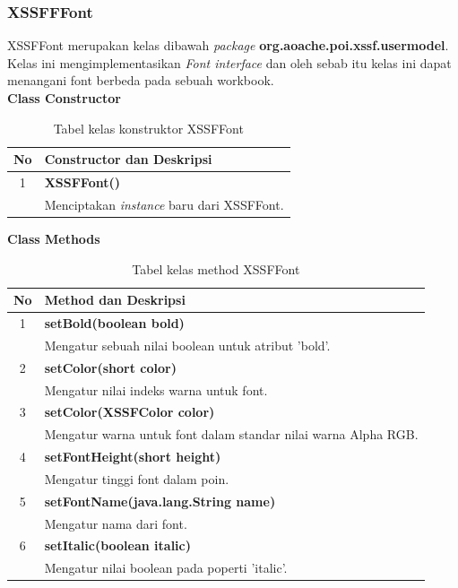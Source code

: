\subsubsection{XSSFFFont}
\label{subs:XSSFFFont}
XSSFFont merupakan kelas dibawah \textit{package} \textbf{org.aoache.poi.xssf.usermodel}. Kelas ini mengimplementasikan \textit{Font interface} dan oleh sebab itu kelas ini dapat menangani font berbeda pada sebuah workbook.\cite{apachepoi2}
\\
\noindent \textbf{Class Constructor}
\begin{table}[H]
		\centering
		\caption{Tabel kelas konstruktor XSSFFont}
		\label{tab:KonstrukXSSFFont}
	\begin{tabular}{|c|p{12cm}|}
		\hline
		\textbf{No} & \textbf{Constructor dan Deskripsi} \\ \hline \hline
		1 & \textbf{XSSFFont()}\\
			&	Menciptakan \textit{instance} baru dari XSSFFont.\\ \hline
	\end{tabular}
\end{table}

\noindent \textbf{Class Methods}
\begin{table}[H]
		\centering
		\caption{Tabel kelas method XSSFFont}
		\label{tab:methodXSSFFont}
	\begin{tabular}{|c|p{12cm}|}
		\hline
		\textbf{No} & \textbf{Method dan Deskripsi} \\ \hline \hline
		1 & \textbf{setBold(boolean bold)}\\
			&	Mengatur sebuah nilai boolean untuk atribut 'bold'.\\ \hline
		2 & \textbf{setColor(short color)}\\
			&	Mengatur nilai indeks warna untuk font.\\ \hline
		3 & \textbf{setColor(XSSFColor color)}\\
			&	Mengatur warna untuk font dalam standar nilai warna Alpha RGB.\\ \hline
		4 & \textbf{setFontHeight(short height)}\\
			&	Mengatur tinggi font dalam poin.\\ \hline
		5 & \textbf{setFontName(java.lang.String name)}\\
			&	Mengatur nama dari font.\\ \hline
		6 & \textbf{setItalic(boolean italic)}\\
			&	Mengatur nilai boolean pada poperti 'italic'.\\ \hline					
	\end{tabular}
\end{table}

